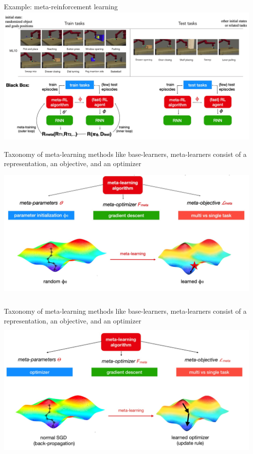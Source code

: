 \documentclass[aspectratio=169,t,handout,xcolor={usenames,dvipsnames}]{beamer}
\begin{document}
\begin{frame}{Example: meta-reinforcement learning}
    \centering\includegraphics[height=7cm]{image/Jietu20220329-004129.jpg}
\end{frame}

\begin{frame}{Taxonomy of meta-learning methods}
    \small like base-learners, meta-learners consist of a representation, an objective, and an optimizer
    \centering\includegraphics[height=7cm]{image/Jietu20220329-004512.jpg}
\end{frame}


\begin{frame}{Taxonomy of meta-learning methods}
    \small like base-learners, meta-learners consist of a representation, an objective, and an optimizer
    \centering\includegraphics[height=7cm]{image/Jietu20220329-004703.jpg}
\end{frame}
\end{document}
